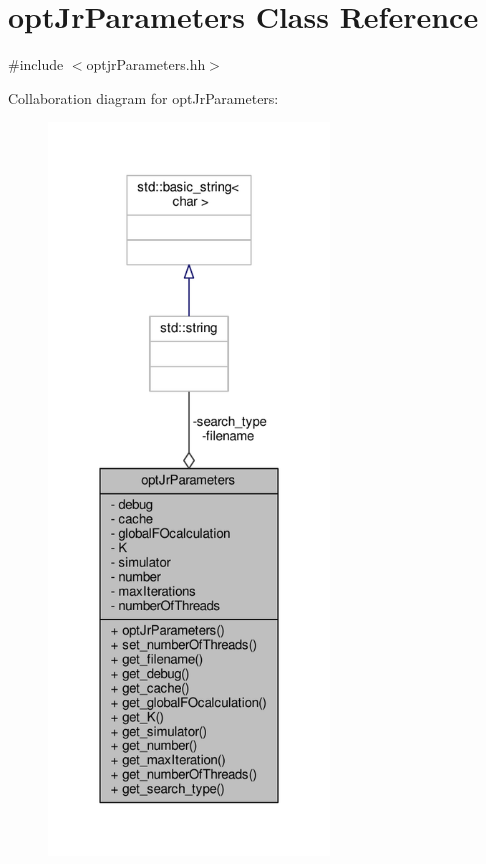\hypertarget{classoptJrParameters}{\section{opt\-Jr\-Parameters Class Reference}
\label{classoptJrParameters}
}


{\ttfamily \#include $<$optjr\-Parameters.\-hh$>$}



Collaboration diagram for opt\-Jr\-Parameters\-:
\nopagebreak
\begin{figure}[H]
\begin{center}
\leavevmode
\includegraphics[height=550pt]{classoptJrParameters__coll__graph}
\end{center}
\end{figure}

